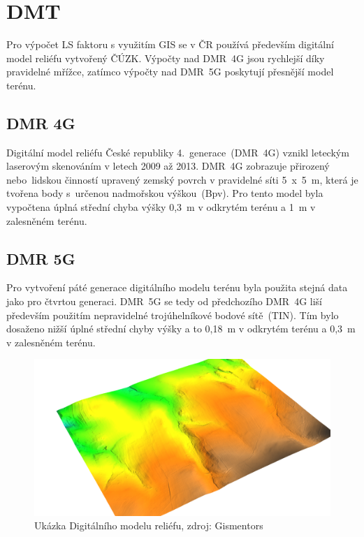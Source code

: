 \section{DMT}
\label{3-dmt}
Pro výpočet LS faktoru s využitím GIS se v ČR používá především
digitální model reliéfu vytvořený ČÚZK\cite{cuzk}. Výpočty nad
DMR~4G jsou rychlejší díky pravidelné mřížce, zatímco výpočty nad
DMR~5G poskytují přesnější model terénu.
\subsection{DMR 4G}
Digitální model reliéfu České republiky 4.~generace~(DMR~4G)
vznikl leteckým laserovým skenováním v letech 2009 až 2013. DMR~4G 
zobrazuje přirozený nebo~lidskou činností upravený zemský povrch v 
pravidelné síti 5~x~5~m, která je tvořena body s~určenou nadmořskou
výškou~(Bpv). Pro tento model byla vypočtena úplná střední chyba výšky
0,3~m v odkrytém terénu a 1~m v zalesněném terénu.
\subsection{DMR 5G}
\label{3-dmr5g}
Pro vytvoření páté generace digitálního modelu terénu byla použita
stejná data jako pro čtvrtou generaci. DMR~5G se tedy od předchozího
DMR~4G liší především použitím nepravidelné trojúhelníkové bodové
sítě~(TIN). Tím bylo dosaženo nižší úplné střední chyby výšky a to
0,18~m v odkrytém terénu a 0,3~m v zalesněném terénu.
\begin{figure}[H]
    \centering \includegraphics[scale=0.32]{./pictures/dmr.png}
      \caption[Ukázka Digitálního modelu reliéfu]{Ukázka Digitálního modelu reliéfu, zdroj: Gismentors\cite{gismentorsdmr}}
      \label{fig:lpis}
\end{figure}